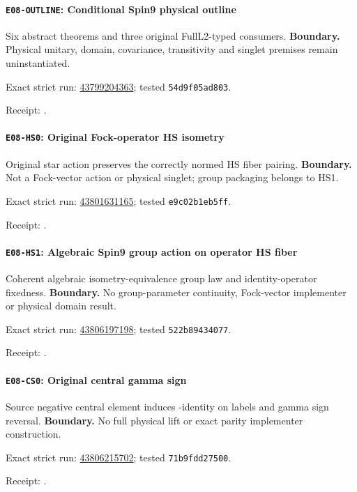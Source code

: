 \paragraph{\texttt{E08-OUTLINE}: Conditional Spin9 physical outline}
Six abstract theorems and three original FullL2-typed consumers.
\textbf{Boundary.} Physical unitary, domain, covariance, transitivity and singlet premises remain uninstantiated.
\par\noindent Exact strict run: \href{https://github.com/etblink/math/actions/runs/43799204363}{43799204363}; tested \texttt{54d9f05ad803}.\par
\begingroup\small\sloppy\noindent Receipt: .\par\endgroup
\paragraph{\texttt{E08-HS0}: Original Fock-operator HS isometry}
Original star action preserves the correctly normed HS fiber pairing.
\textbf{Boundary.} Not a Fock-vector action or physical singlet; group packaging belongs to HS1.
\par\noindent Exact strict run: \href{https://github.com/etblink/math/actions/runs/43801631165}{43801631165}; tested \texttt{e9c02b1eb5ff}.\par
\begingroup\small\sloppy\noindent Receipt: .\par\endgroup
\paragraph{\texttt{E08-HS1}: Algebraic Spin9 group action on operator HS fiber}
Coherent algebraic isometry-equivalence group law and identity-operator fixedness.
\textbf{Boundary.} No group-parameter continuity, Fock-vector implementer or physical domain result.
\par\noindent Exact strict run: \href{https://github.com/etblink/math/actions/runs/43806197198}{43806197198}; tested \texttt{522b89434077}.\par
\begingroup\small\sloppy\noindent Receipt: .\par\endgroup
\paragraph{\texttt{E08-CS0}: Original central gamma sign}
Source negative central element induces -identity on labels and gamma sign reversal.
\textbf{Boundary.} No full physical lift or exact parity implementer construction.
\par\noindent Exact strict run: \href{https://github.com/etblink/math/actions/runs/43806215702}{43806215702}; tested \texttt{71b9fdd27500}.\par
\begingroup\small\sloppy\noindent Receipt: .\par\endgroup
